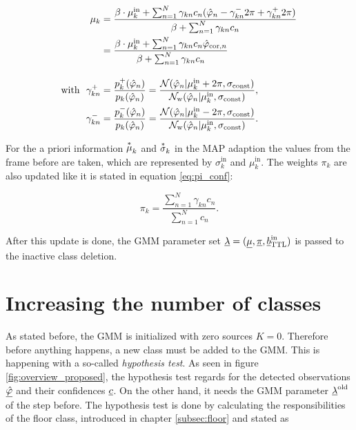 \begin{equation}
\begin{split}
\mu_k &= \frac{\beta\cdot\mu_k^{\text{in}}+\sum^{N}_{n=1}\gamma_{kn}c_n(\hat{\varphi}_n-\gamma^-_{kn}2\pi+\gamma^+_{kn}2\pi)}{\beta+\sum^{N}_{n=1}\gamma_{kn}c_n}\\
&= \frac{\beta\cdot\mu_k^{\text{in}}+\sum^{N}_{n=1}\gamma_{kn}c_n\hat{\varphi}_{\text{cor},n}}{\beta+\sum^{N}_{n=1}\gamma_{kn}c_n}\\[1em]
\text{with }\ \gamma^+_{kn}&=
\frac{p^+_k(\hat{\varphi}_n)}{p_k(\hat{\varphi}_n)}=
\frac{\mathcal{N}(\hat{\varphi}_n|\mu_k^\text{in}+2\pi,\sigma_\text{const})}{\mathcal{N}_\text{w}(\hat{\varphi}_n|\mu_k^\text{in},\sigma_\text{const})}, \\
\gamma^-_{kn}&=\frac{p^-_k(\hat{\varphi}_n)}{p_k(\hat{\varphi}_n)}=
\frac{\mathcal{N}(\hat{\varphi}_n|\mu_k^\text{in}-2\pi,\sigma_\text{const})}{\mathcal{N}_\text{w}(\hat{\varphi}_n|\mu_k^\text{in},\sigma_\text{const})}.
\label{eq:mu_final}
\end{split}
\end{equation}

For the a priori information $\oast \mu_k$ and $\oast \sigma_k$ in the MAP adaption the values from the frame before are taken, which are represented by $\sigma_k^\text{in}$ and $\mu_k^\text{in}$.
The weights $\pi_k$ are also updated like it is stated in equation \ref{eq:pi_conf}:

\begin{equation}
\pi_k = \frac{\sum^N_{n=1}\gamma_{kn}c_n}{\sum_{n=1}^{N} c_n}.
\end{equation}

After this update is done, the \ac{GMM} parameter set $\underline{\lambda} = (\underline{\mu}, \underline{\pi}, \underline{b}_\text{TTL}^\text{in})$ is passed to the inactive class deletion.

\section{Increasing the number of classes}
\label{sec:hyp_test}
As stated before, the \ac{GMM} is initialized with zero sources $K=0$. Therefore before anything happens, a new class must be added to the \ac{GMM}. This is happening with a so-called \emph{hypothesis test}. As seen in figure \ref{fig:overview_proposed}, the hypothesis test regards for the detected observations $\underline{\hat{\varphi}}$ and their confidences $\underline{c}$. On the other hand, it needs the \ac{GMM} parameter $\underline{\lambda}^\text{old}$ of the step before. The hypothesis test is done by calculating the responsibilities of the floor class, introduced in chapter \ref{subsec:floor} and stated as

